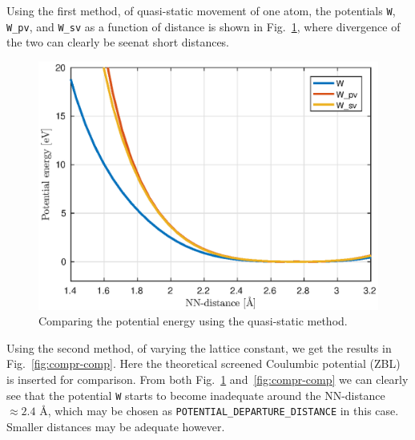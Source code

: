 \documentclass{article}
\begin{document}
Using the first method, of quasi-static movement of one atom, the potentials \texttt{W}, \texttt{W\_pv}, and \texttt{W\_sv} as a function of distance is shown in Fig.~\ref{fig:quasi-comp}, where divergence of the two can clearly be seenat short distances.

\begin{figure}[H]
  \centering
  \includegraphics[scale=0.82]{img/pot-comp-quasi2.eps}
  \caption{Comparing the potential energy using the quasi-static method.}
  \label{fig:quasi-comp}
\end{figure}

Using the second method, of varying the lattice constant, we get the results in Fig.~\ref{fig:compr-comp}. Here the theoretical screened Coulumbic potential (ZBL) is inserted for comparison. From both Fig.~\ref{fig:quasi-comp} and~\ref{fig:compr-comp} we can clearly see that the potential \texttt{W} starts to become inadequate around the NN-distance $\approx 2.4$ Å, which may be chosen as \texttt{POTENTIAL\_DEPARTURE\_DISTANCE} in this case. Smaller distances may be adequate however.

\end{document}
